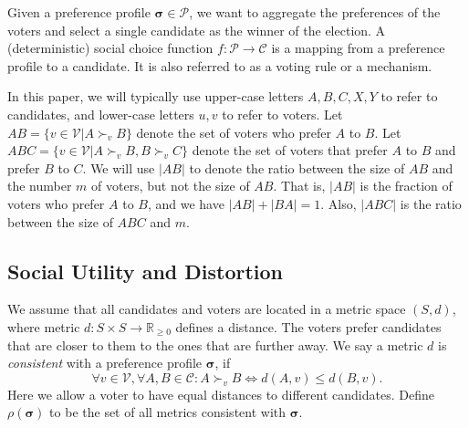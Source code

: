 \documentclass[11pt]{article}
\theoremstyle{remark}
\begin{document}
Given a preference profile $\bm{\sigma}\in\mathcal P$, we want to aggregate the preferences of the voters and select a single candidate as the winner of the election. A (deterministic) social choice function $f:\mathcal P\rightarrow \mathcal C$ is
a mapping from a preference profile to a candidate. It is also referred to as a voting rule or a mechanism.



In this paper, we will typically use upper-case letters $A,B,C,X,Y$ to refer to candidates, and lower-case letters $u,v$ to refer to voters. Let $AB=\{v\in\mathcal V|A\succ_vB\}$ denote the set of voters who prefer $A$ to $B$. Let $ABC=\{v\in\mathcal V|A\succ_vB,B\succ_vC\}$ denote the set of voters that prefer $A$ to $B$ and prefer $B$ to $C$. We will use $|AB|$ to denote the ratio between the size of $AB$ and the number $m$ of voters, but not the size of $AB$. That is, $|AB|$ is the fraction of voters who prefer $A$ to $B$, and we have $|AB|+|BA|=1$. Also, $|ABC|$ is the ratio between the size of $ABC$ and $m$.

\subsection{Social Utility and Distortion}

We assume that all candidates and voters are located in a metric space $(S,d)$, where metric $d:S\times S\rightarrow \mathbb{R}_{\ge 0}$ defines a distance. The voters prefer
candidates that are closer to them to the ones that are further away.
We say a metric $d$ is \emph{consistent} with a preference profile $\bm{\sigma}$, if
 $$\forall v\in \mathcal V, \forall A, B\in \mathcal C: A\succ_v B\Longleftrightarrow d(A,v)\le d(B,v).$$
  Here we allow a voter to have equal distances to different candidates. Define $\rho (\bm{\sigma})$ to be the set of all metrics consistent with $\bm{\sigma}$.%
\end{document}
